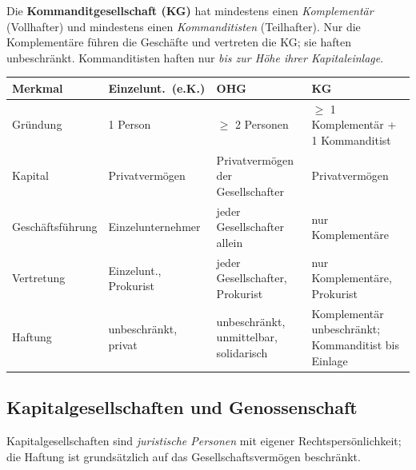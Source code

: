 \documentclass[11pt, a4paper]{article}
\begin{document}
Die \textbf{Kommanditgesellschaft (KG)} hat mindestens einen \emph{Komplementär}
(Vollhafter) und mindestens einen \emph{Kommanditisten} (Teilhafter). Nur die
Komplementäre führen die Geschäfte und vertreten die KG; sie haften unbeschränkt.
Kommanditisten haften nur \emph{bis zur Höhe ihrer Kapitaleinlage}.

\begin{center}
\begin{tabular}{p{2.9cm} p{3.2cm} p{3.2cm} p{3.4cm}}
\toprule
\textbf{Merkmal} & \textbf{Einzelunt.\ (e.K.)} & \textbf{OHG} & \textbf{KG}\\
\midrule
Gründung & 1 Person & $\geq$ 2 Personen & $\geq$ 1 Komplementär + 1 Kommanditist\\
Kapital & Privatvermögen & Privatvermögen der Gesellschafter & Privatvermögen\\
Geschäftsführung & Einzelunternehmer & jeder Gesellschafter allein & nur Komplementäre\\
Vertretung & Einzelunt., Prokurist & jeder Gesellschafter, Prokurist & nur Komplementäre, Prokurist\\
Haftung & unbeschränkt, privat & unbeschränkt, unmittelbar, solidarisch & Komplementär unbeschränkt; Kommanditist bis Einlage\\
\bottomrule
\end{tabular}
\end{center}

\subsection{Kapitalgesellschaften und Genossenschaft}

Kapitalgesellschaften sind \emph{juristische Personen} mit eigener Rechtspersönlichkeit;
die Haftung ist grundsätzlich auf das Gesellschaftsvermögen beschränkt.
\end{document}
